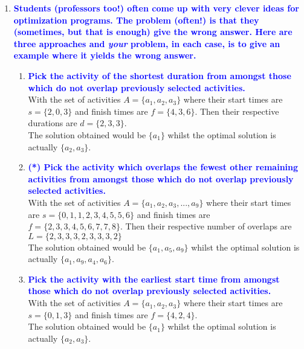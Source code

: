 \documentclass[11pt]{article}
\begin{document}
\begin{enumerate}
\item \textbf{\textcolor{blue}{Students (professors too!) often come up with very clever ideas for
optimization programs.  The problem (often!) is that they (sometimes, but that
is enough) give the wrong answer.  Here are three approaches and {\em your} problem,
in each case, is to give an example where it yields the wrong answer.}}
    \begin{enumerate}
    \item \textbf{\textcolor{blue}{Pick the activity of the shortest duration 
    from amongst those which do not overlap previously selected activities.}}
        \\ With the set of activities $A = \{a_1, a_2, a_3\}$ where their start times are $s = \{2, 0, 3\}$ and finish times are $f = \{4, 3, 6\}$. Then their respective durations are $d = \{2, 3, 3\}$.
        \\ The solution obtained would be $\{a_1\}$ whilst the optimal solution is actually $\{a_2, a_3\}$.
    \item \textbf{\textcolor{blue}{(*) Pick the activity which overlaps the fewest other remaining activities
    from amongst those which do not overlap previously selected activities.}}
        \\ With the set of activities $A = \{a_1, a_2, a_3, ..., a_9\}$ where their start times are $s = \{0, 1, 1, 2, 3, 4, 5, 5, 6\}$ and finish times are $f = \{2, 3, 3, 4, 5, 6, 7, 7, 8\}$. Then their respective number of overlaps are $L = \{2, 3, 3, 3, 2, 3, 3, 3, 2\}$
        \\ The solution obtained would be $\{a_1, a_5, a_9\}$ whilst the optimal solution is actually $\{a_1, a_9, a_4, a_6\}$.
    \item \textbf{\textcolor{blue}{Pick the activity with the earliest start time
    from amongst those which do not overlap previously selected activities.}}
        \\ With the set of activities $A = \{a_1, a_2, a_3\}$ where their start times are $s = \{0, 1, 3\}$ and finish times are $f = \{4, 2, 4\}$. 
        \\ The solution obtained would be $\{a_1\}$ whilst the optimal solution is actually $\{a_2, a_3\}$.
    \end{enumerate}
\end{enumerate}
\end{document}
